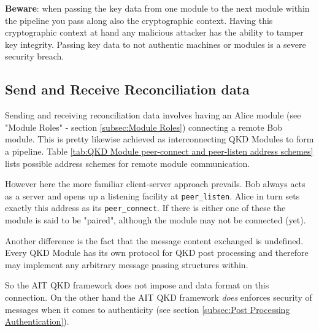 \vspace{2cm}

\begin{center}
\begin{minipage}{10cm}
\textbf{Beware}: when passing the key data from one module to the next module within the pipeline you pass along also the cryptographic context. Having this cryptographic context at hand any malicious attacker has the ability to tamper key integrity. Passing key data to not authentic machines or modules is a severe security breach.
\end{minipage}
\end{center}

\vspace{2cm}

\subsection{Send and Receive Reconciliation data}
\label{subsec:Send and Receive Reconciliation data}

Sending and receiving reconciliation data involves having an Alice module (see "Module Roles" - section \ref{subsec:Module Roles}) connecting a remote Bob module. This is pretty likewise achieved as interconnecting QKD Modules to form a pipeline. Table \ref{tab:QKD Module peer-connect and peer-listen address schemes} lists possible address schemes for remote module communication.

\medskip

However here the more familiar client-server approach prevails. Bob always acts as a server and opens up a listening facility at \texttt{peer\_listen}. Alice in turn sets exactly this address as its \texttt{peer\_connect}. If there is either one of these the module is said to be "paired", although the module may not be connected (yet).

\medskip

Another difference is the fact that the message content exchanged is undefined. Every QKD Module has its own protocol for QKD post processing and therefore may implement any arbitrary message passing structures within.

\medskip

So the AIT QKD framework does not impose and data format on this connection. On the other hand the AIT QKD framework \emph{does} enforces security of messages when it comes to authenticity (see section \ref{subsec:Post Processing Authentication}).


